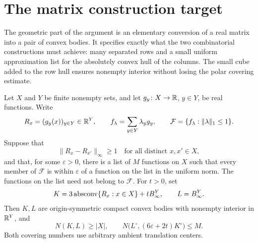 \section{The matrix construction target}
\label{sec:convex-bodies}

The geometric part of the argument is an elementary conversion of a real
matrix into a pair of convex bodies. It specifies exactly what the two
combinatorial constructions must achieve: many separated rows and a small
uniform approximation list for the absolutely convex hull of the columns.
The small cube added to the row hull ensures nonempty interior without
losing the polar covering estimate.

\begin{lemma}
\label{lem:matrix-to-bodies}
Let $X$ and $Y$ be finite nonempty sets, and let
$g_y\colon X\to\mathbb R$, $y\in Y$, be real functions.  Write
\[
 R_x=(g_y(x))_{y\in Y}\in\mathbb R^Y,
 \qquad
 f_\lambda=\sum_{y\in Y}\lambda_y g_y,
 \qquad
 \mathcal F=\{f_\lambda:\|\lambda\|_1\le1\}.
\]
Suppose that
\[
 \|R_x-R_{x'}\|_\infty\ge1
 \quad\text{for all distinct }x,x'\in X,
\]
and that, for some $\varepsilon>0$, there is a list of $M$ functions on
$X$ such that every member of $\mathcal F$ is within
$\varepsilon$ of a function on the list in the uniform norm.
The functions on the list need not belong to $\mathcal F$.
For $t>0$, set
\[
 K=3\operatorname{absconv}\{R_x:x\in X\}+tB_\infty^Y,
 \qquad L=B_\infty^Y.
\]
Then $K,L$ are origin-symmetric compact convex bodies with nonempty
interior in $\mathbb R^Y$, and
\begin{equation}
\label{eq:matrix-body-bounds}
 N(K,L)\ge |X|,
 \qquad
 N\bigl(L^\circ,(6\varepsilon+2t)K^\circ\bigr)\le M.
\end{equation}
Both covering numbers use arbitrary ambient translation centers.
\end{lemma}

